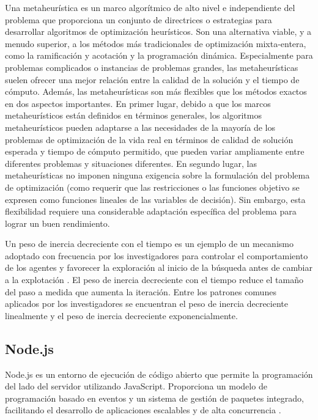 \documentclass[conference]{IEEEtran}
\begin{document}
Una metaheurística es un marco algorítmico de alto nivel e independiente del
problema que proporciona un conjunto de directrices o estrategias para
desarrollar algoritmos de optimización heurísticos. Son una alternativa viable,
y a menudo superior, a los métodos más tradicionales de optimización
mixta-entera, como la ramificación y acotación y la programación dinámica.
Especialmente para problemas complicados o instancias de problemas grandes, las
metaheurísticas suelen ofrecer una mejor relación entre la calidad de la
solución y el tiempo de cómputo. Además, las metaheurísticas son más flexibles
que los métodos exactos en dos aspectos importantes. En primer lugar, debido a
que los marcos metaheurísticos están definidos en términos generales, los
algoritmos metaheurísticos pueden adaptarse a las necesidades de la mayoría de
los problemas de optimización de la vida real en términos de calidad de
solución esperada y tiempo de cómputo permitido, que pueden variar ampliamente
entre diferentes problemas y situaciones diferentes. En segundo lugar, las
metaheurísticas no imponen ninguna exigencia sobre la formulación del problema
de optimización (como requerir que las restricciones o las funciones objetivo
se expresen como funciones lineales de las variables de decisión). Sin embargo,
esta flexibilidad requiere una considerable adaptación específica del problema
para lograr un buen rendimiento\cite{soerensen2010}.

Un peso de inercia decreciente con el tiempo es un ejemplo de un mecanismo
adoptado con frecuencia por los investigadores para controlar el comportamiento
de los agentes y favorecer la exploración al inicio de la búsqueda antes de
cambiar a la explotación \cite{eberhart2000, bansal2011,
    elkhateeb2013}. El peso de inercia decreciente con el tiempo reduce el
tamaño del paso a medida que aumenta la
iteración. Entre los patrones comunes aplicados por los investigadores se
encuentran el peso de inercia decreciente linealmente y el peso de inercia
decreciente exponencialmente\cite{bansal2011}.

\subsection{Node.js}
Node.js es un entorno de ejecución de código abierto que permite la
programación del lado del servidor utilizando JavaScript. Proporciona un modelo
de programación basado en eventos y un sistema de gestión de paquetes
integrado, facilitando el desarrollo de aplicaciones escalables y de alta
concurrencia \cite{shah2017}.
\end{document}
